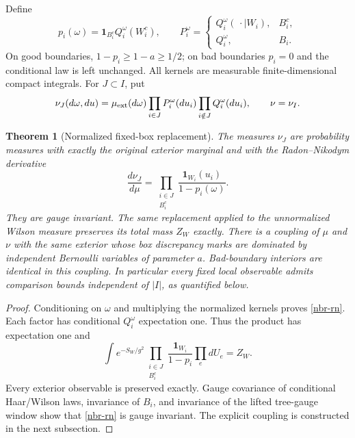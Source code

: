 \documentclass[11pt]{article}
\newtheorem{theorem}{Theorem}[section]
\theoremstyle{remark}
\begin{document}
Define
\begin{equation}
 p_i(\omega)=\mathbf1_{B_i^c}Q_i^\omega(W_i^c),\qquad
 P_i^\omega=
 \begin{cases}
 Q_i^\omega(\,\cdot\mid W_i),&B_i^c,\\
 Q_i^\omega,&B_i.
 \end{cases}
 \label{nbr-kernels}
\end{equation}
On good boundaries, \(1-p_i\ge1-a\ge1/2\); on bad boundaries
\(p_i=0\) and the conditional law is left unchanged. All kernels are
measurable finite-dimensional compact integrals. For \(J\subset I\),
put
\begin{equation}
 \nu_J(d\omega,du)=\mu_{\rm ext}(d\omega)
       \prod_{i\in J}P_i^\omega(du_i)
       \prod_{i\notin J}Q_i^\omega(du_i),\qquad \nu=\nu_I.
 \label{nbr-replacement}
\end{equation}

\begin{theorem}[Normalized fixed-box replacement]
\label{nbr-main}
The measures \(\nu_J\) are probability measures with exactly the
original exterior marginal and with the Radon--Nikodym derivative
\begin{equation}
 \frac{d\nu_J}{d\mu}
 =\prod_{\substack{i\in J\\B_i^c}}
             \frac{\mathbf1_{W_i}(u_i)}{1-p_i(\omega)}.
 \label{nbr-rn}
\end{equation}
They are gauge invariant. The same replacement applied to the
unnormalized Wilson measure preserves its total mass \(Z_W\) exactly.
There is a coupling of \(\mu\) and \(\nu\) with the same exterior
whose box discrepancy marks are dominated by independent Bernoulli
variables of parameter \(a\). Bad-boundary interiors are identical
in this coupling. In particular every fixed local observable admits
comparison bounds independent of \(|I|\), as quantified below.
\end{theorem}
\begin{proof}
Conditioning on \(\omega\) and multiplying the normalized kernels
proves \eqref{nbr-rn}. Each factor has conditional \(Q_i^\omega\)
expectation one. Thus the product has expectation one and
\begin{equation}
 \int e^{-S_W/g^2}
       \prod_{\substack{i\in J\\B_i^c}}
          \frac{\mathbf1_{W_i}}{1-p_i}\prod_e dU_e=Z_W.
 \label{nbr-raw-mass}
\end{equation}
Every exterior observable is preserved exactly. Gauge covariance of
conditional Haar/Wilson laws, invariance of \(B_i\), and invariance
of the lifted tree-gauge window show that \eqref{nbr-rn} is gauge
invariant. The explicit coupling is constructed in the next subsection.
\end{proof}
\end{document}
